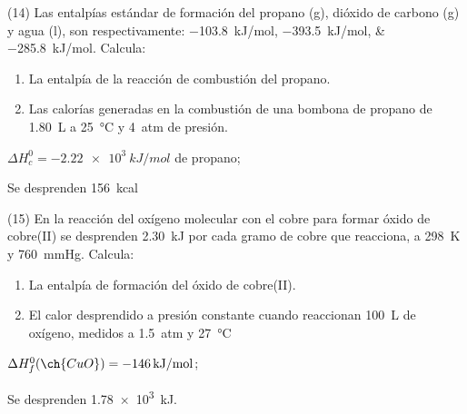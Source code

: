 \documentclass[10pt]{article}
\begin{document}
\begin{multicols}{2}
\begin{exercise}[
    tags    = {},
    topics  = {química,química básica},
    source  = {FQ 1B MGH 2016, p85, e26},
  ]
  (14) Las entalpías estándar de formación del propano (g),
  dióxido de carbono (g) y agua (l), son respectivamente:
  \SIlist{-103,8;-393,5;-285,8}{kJ/mol}. Calcula:
  \begin{enumerate}
    \item La entalpía de la reacción de combustión del propano.
    \item Las calorías generadas en la combustión de una bombona de propano de \SI{1.80}{\liter} a \SI{25}{\celsius} y \SI{4}{atm} de presión.
  \end{enumerate}
\end{exercise}

\begin{solution}
  \begin{enumerate*}
    \item \( \Delta H^0_c = \SI{-2.22e3}{kJ/mol} \) de propano;
    \item Se desprenden \SI{156}{kcal}
  \end{enumerate*}
\end{solution}




\begin{exercise}[
    tags    = {},
    topics  = {química,química básica},
    source  = {FQ 1B MGH 2016, p85, e26},
  ]

  (15) En la reacción del oxígeno molecular con el cobre para formar
  óxido de cobre(II) se desprenden \SI{2.30}{kJ} por cada gramo de
  cobre que reacciona, a \SI{298}{\kelvin} y \SI{760}{\mmHg}. Calcula:
  \begin{enumerate}
    \item La entalpía de formación del óxido de cobre(II).
    \item El calor desprendido a presión constante cuando reaccionan \SI{100}{\liter} de oxígeno, medidos a \SI{1.5}{atm} y \SI{27}{\celsius}
  \end{enumerate}
\end{exercise}

\begin{solution}
  \begin{enumerate*}
    \item \( \Delta H^0_f (\ch{CuO}) = \SI{-146}{kJ/mol} \);
    \item Se desprenden \SI{1.78e3}{kJ}.
  \end{enumerate*}
\end{solution}




\begin{exercise}[
    tags    = {},
    topics  = {química,química básica},
    source  = {FQ 1B MGH 2016, p85, e26},
  ]


\end{exercise}
\end{multicols}
\end{document}
